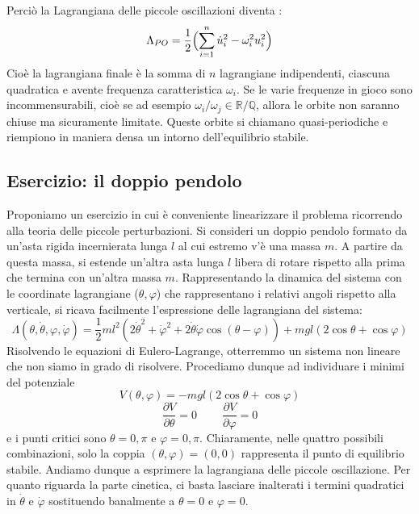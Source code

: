 \documentclass[a4paper,openany]{article}
\begin{document}
	Perciò la Lagrangiana delle piccole oscillazioni diventa 
	:
	\begin{equation}\label{key}
		\Lambda_{PO} = \dfrac{1}{2}\Bigl(\sum_{i=1}^{n}\dot{u}_{i}^{2} - \omega_{i}^{2}u_{i}^{2}\Bigl)
	\end{equation}
	Cioè la lagrangiana finale è la somma di $n$ lagrangiane indipendenti, ciascuna quadratica e avente frequenza caratteristica $\omega_{i}$. Se le varie frequenze in gioco sono incommensurabili, cioè se ad esempio $\omega_{i}/\omega_{j} \in \mathbb{R}/\mathbb{Q}$, allora le orbite non saranno chiuse ma sicuramente limitate. Queste orbite si chiamano quasi-periodiche e riempiono in maniera densa un intorno dell'equilibrio stabile.
	\subsection{Esercizio: il doppio pendolo}
	Proponiamo un esercizio in cui è conveniente linearizzare il problema ricorrendo alla teoria delle piccole perturbazioni. Si consideri un doppio pendolo formato da un'asta rigida incernierata lunga $l$ al cui estremo v'è una massa $m$. A partire da questa massa, si estende un'altra asta lunga $l$ libera di rotare rispetto alla prima che termina con un'altra massa $m$. Rappresentando la dinamica del sistema con le coordinate lagrangiane ($\theta,\varphi$) che rappresentano i relativi angoli rispetto alla verticale, si ricava facilmente l'espressione delle lagrangiana del sistema:
	\begin{equation}\label{key}
		\Lambda(\theta,\dot{\theta},\varphi,\dot{\varphi}) = \dfrac{1}{2}ml^2 (2\dot{\theta}^2+ \dot{\varphi}^2 + 2\dot{\theta}\dot{\varphi}\cos(\theta-\varphi)) + mgl(2\cos\theta + \cos\varphi)
	\end{equation}
	Risolvendo le equazioni di Eulero-Lagrange, otterremmo un sistema non lineare che non siamo in grado di risolvere. Procediamo dunque ad individuare i minimi del potenziale 
	$$
	V(\theta,\varphi) = -mgl(2\cos\theta + \cos\varphi)
	$$
	$$
	\dfrac{\partial V}{\partial \theta} = 0 \>\> \>\> \>\> \>\> \>\> \dfrac{\partial V}{\partial \varphi} = 0
	$$
	e i punti critici sono $\theta =0,\pi$ e $\varphi = 0,\pi$. Chiaramente, nelle quattro possibili combinazioni, solo la coppia $(\theta,\varphi)=(0,0)$ rappresenta il punto di equilibrio stabile. Andiamo dunque a esprimere la lagrangiana delle piccole oscillazione. Per quanto riguarda la parte cinetica, ci basta lasciare inalterati i termini quadratici in $\dot{\theta} \mbox{ e }\dot{\varphi}$ sostituendo banalmente a $\theta = 0 \mbox{ e } \varphi = 0$.
\end{document}
